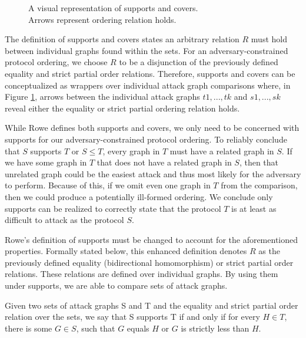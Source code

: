 \documentclass[runningheads]{llncs}
\theoremstyle{definition}
\begin{document}
\begin{figure}[htbp]
    \centering
    
    \captionsetup{justification=centering,margin=1cm}
    \caption[Supports and covers]{A visual representation of supports and covers. \\ Arrows represent ordering relation holds.}
    \label{fig:sup-cov}
\end{figure}

The definition of supports and covers states an arbitrary relation $R$ must hold between individual graphs found within the sets. For an adversary-constrained protocol ordering, we choose $R$ to be a disjunction of the previously defined equality and strict partial order relations. Therefore, supports and covers can be conceptualized as wrappers over individual attack graph comparisons where, in Figure \ref{fig:sup-cov}, arrows between the individual attack graphs $t1, ... ,tk$ and $s1, ... ,sk$ reveal either the equality or strict partial ordering relation holds. 

While Rowe defines both supports and covers, we only need to be concerned with supports for our adversary-constrained protocol ordering. To reliably conclude that $S$ supports $T$ or $S \leq T$, every graph in $T$ must have a related graph in $S$. If we have some graph in $T$ that does not have a related graph in $S$, then that unrelated graph could be the easiest attack and thus most likely for the adversary to perform. Because of this, if we omit even one graph in $T$ from the comparison, then we could produce a potentially ill-formed ordering. We conclude only supports can be realized to correctly state that the protocol $T$ is at least as difficult to attack as the protocol $S$. 

Rowe's \cite{Rowe:2021:OnOrdering} definition of supports must be changed to account for the aforementioned properties. Formally stated below, this enhanced definition denotes $R$ as the previously defined equality (bidirectional homomorphism) or strict partial order relations. These relations are defined over individual graphs. By using them under supports, we are able to compare sets of attack graphs. 

\begin{definition}
    Given two sets of attack graphs S and T and the equality and strict partial order relation over the sets, we say that S supports T if and only if for every $H \in T$, there is some $G \in S$, such that $G$ equals $H$ or $G$ is strictly less than $H$.
\end{definition}
\end{document}
